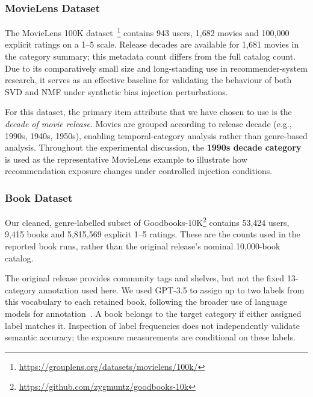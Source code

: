 \documentclass[information,article,submit,pdftex,moreauthors]{Definitions/mdpi}
\newif\ifrevisionnotes
\newcommand{\saracomment}[1]{\ifrevisionnotes\par\smallskip\noindent\textcolor{orange}{\textbf{Sara:} #1}\par\smallskip\fi}
\begin{document}
\subsubsection{MovieLens Dataset}

The MovieLens 100K dataset~\cite{harper2015movielens}\footnote{\url{https://grouplens.org/datasets/movielens/100k/}} contains 943 users, 1,682 movies and 100,000 explicit ratings on a 1--5 scale. Release decades are available for 1,681 movies in the category summary; this metadata count differs from the full catalog count.
Due to its comparatively small size and long-standing use in recommender-system research, it serves as an effective baseline for validating the behaviour of both SVD and NMF under synthetic bias injection perturbations.

For this dataset, the primary item attribute that we have chosen to use is the \textit{decade of movie release}. Movies are grouped according to release decade (e.g., 1990s, 1940s, 1950s), enabling temporal-category analysis rather than genre-based analysis. Throughout the experimental discussion, the \textbf{1990s decade category}  is used as the representative MovieLens example to illustrate how recommendation exposure changes under controlled injection conditions. 

\saracomment{Removed the unsupported assertion that the book dataset is sparser than MovieLens. Clarified that inspecting genre-label distributions does not independently validate label accuracy.}

\subsubsection{Book Dataset}

Our cleaned, genre-labelled subset of Goodbooks-10K\footnote{\url{https://github.com/zygmuntz/goodbooks-10k}} contains 53,424 users, 9,415 books and 5,815,569 explicit 1--5 ratings. These are the counts used in the reported book runs, rather than the original release's nominal 10,000-book catalog.

The original release provides community tags and shelves, but not the fixed 13-category annotation used here. We used GPT-3.5 to assign up to two labels from this vocabulary to each retained book, following the broader use of language models for annotation~\cite{zhang-etal-2023-llmaaa,zhang2023llmmetadata}. A book belongs to the target category if either assigned label matches it. Inspection of label frequencies does not independently validate semantic accuracy; the exposure measurements are conditional on these labels.
\end{document}
